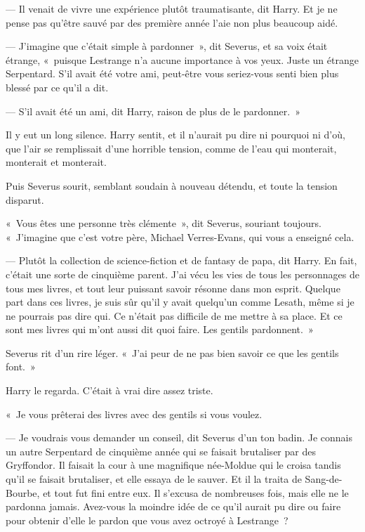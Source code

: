 --- Il venait de vivre une expérience plutôt traumatisante, dit Harry.
Et je ne pense pas qu'être sauvé par des première année l'aie non plus beaucoup aidé.

--- J'imagine que c'était simple à pardonner~», dit Severus, et sa voix était étrange, «~puisque Lestrange n'a aucune importance à vos yeux.
Juste un étrange Serpentard.
S'il avait été votre ami, peut-être vous seriez-vous senti bien plus blessé par ce qu'il a dit.

--- S'il avait été un ami, dit Harry, raison de plus de le pardonner.~»

Il y eut un long silence.
Harry sentit, et il n'aurait pu dire ni pourquoi ni d'où, que l'air se remplissait d'une horrible tension, comme de l'eau qui monterait, monterait et monterait.

Puis Severus sourit, semblant soudain à nouveau détendu, et toute la tension disparut.

«~Vous êtes une personne très clémente~», dit Severus, souriant toujours.
«~J'imagine que c'est votre père, Michael Verres-Evans, qui vous a enseigné cela.

--- Plutôt la collection de science-fiction et de fantasy de papa, dit Harry.
En fait, c'était une sorte de cinquième parent.
J'ai vécu les vies de tous les personnages de tous mes livres, et tout leur puissant savoir résonne dans mon esprit.
Quelque part dans ces livres, je suis sûr qu'il y avait quelqu'un comme Lesath, même si je ne pourrais pas dire qui.
Ce n'était pas difficile de me mettre à sa place.
Et ce sont mes livres qui m'ont aussi dit quoi faire.
Les gentils pardonnent.~»

Severus rit d'un rire léger.
«~J'ai peur de ne pas bien savoir ce que les gentils font.~»

Harry le regarda.
C'était à vrai dire assez triste.

«~Je vous prêterai des livres avec des gentils si vous voulez.

--- Je voudrais vous demander un conseil, dit Severus d'un ton badin.
Je connais un autre Serpentard de cinquième année qui se faisait brutaliser par des Gryffondor.
Il faisait la cour à une magnifique née-Moldue qui le croisa tandis qu'il se faisait brutaliser, et elle essaya de le sauver.
Et il la traita de Sang-de-Bourbe, et tout fut fini entre eux.
Il s'excusa de nombreuses fois, mais elle ne le pardonna jamais.
Avez-vous la moindre idée de ce qu'il aurait pu dire ou faire pour obtenir d'elle le pardon que vous avez octroyé à Lestrange~?

